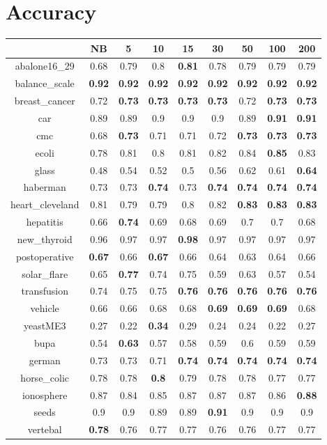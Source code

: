 \documentclass{article}%
\begin{document}
%
\normalsize%
\section*{Accuracy}%
\begin{tabular}{c|cccccccc}%
\hline%
&NB&5&10&15&30&50&100&200\\%
\hline%
abalone16\_29&0.68&0.79&0.8&\textbf{0.81}&0.78&0.79&0.79&0.79\\%
\hline%
balance\_scale&\textbf{0.92}&\textbf{0.92}&\textbf{0.92}&\textbf{0.92}&\textbf{0.92}&\textbf{0.92}&\textbf{0.92}&\textbf{0.92}\\%
\hline%
breast\_cancer&0.72&\textbf{0.73}&\textbf{0.73}&\textbf{0.73}&\textbf{0.73}&0.72&\textbf{0.73}&\textbf{0.73}\\%
\hline%
car&0.89&0.89&0.9&0.9&0.9&0.89&\textbf{0.91}&\textbf{0.91}\\%
\hline%
cmc&0.68&\textbf{0.73}&0.71&0.71&0.72&\textbf{0.73}&\textbf{0.73}&\textbf{0.73}\\%
\hline%
ecoli&0.78&0.81&0.8&0.81&0.82&0.84&\textbf{0.85}&0.83\\%
\hline%
glass&0.48&0.54&0.52&0.5&0.56&0.62&0.61&\textbf{0.64}\\%
\hline%
haberman&0.73&0.73&\textbf{0.74}&0.73&\textbf{0.74}&\textbf{0.74}&\textbf{0.74}&\textbf{0.74}\\%
\hline%
heart\_cleveland&0.81&0.79&0.79&0.8&0.82&\textbf{0.83}&\textbf{0.83}&\textbf{0.83}\\%
\hline%
hepatitis&0.66&\textbf{0.74}&0.69&0.68&0.69&0.7&0.7&0.68\\%
\hline%
new\_thyroid&0.96&0.97&0.97&\textbf{0.98}&0.97&0.97&0.97&0.97\\%
\hline%
postoperative&\textbf{0.67}&0.66&\textbf{0.67}&0.66&0.64&0.63&0.64&0.66\\%
\hline%
solar\_flare&0.65&\textbf{0.77}&0.74&0.75&0.59&0.63&0.57&0.54\\%
\hline%
transfusion&0.74&0.75&0.75&\textbf{0.76}&\textbf{0.76}&\textbf{0.76}&\textbf{0.76}&\textbf{0.76}\\%
\hline%
vehicle&0.66&0.66&0.68&0.68&\textbf{0.69}&\textbf{0.69}&\textbf{0.69}&0.68\\%
\hline%
yeastME3&0.27&0.22&\textbf{0.34}&0.29&0.24&0.24&0.22&0.27\\%
\hline%
bupa&0.54&\textbf{0.63}&0.57&0.58&0.59&0.6&0.59&0.59\\%
\hline%
german&0.73&0.73&0.71&\textbf{0.74}&\textbf{0.74}&\textbf{0.74}&\textbf{0.74}&\textbf{0.74}\\%
\hline%
horse\_colic&0.78&0.78&\textbf{0.8}&0.79&0.78&0.78&0.77&0.77\\%
\hline%
ionosphere&0.87&0.84&0.85&0.87&0.87&0.87&0.86&\textbf{0.88}\\%
\hline%
seeds&0.9&0.9&0.89&0.89&\textbf{0.91}&0.9&0.9&0.9\\%
\hline%
vertebal&\textbf{0.78}&0.76&0.77&0.77&0.76&0.76&0.77&0.77\\%
\hline%
\end{tabular}
\end{document}
